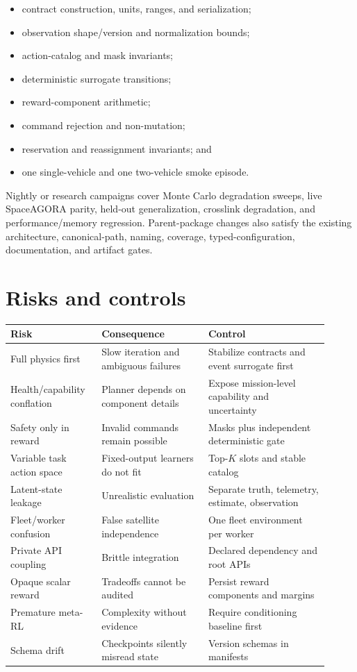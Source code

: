 \documentclass[11pt]{article}
\begin{document}
\begin{itemize}
  \item contract construction, units, ranges, and serialization;
  \item observation shape/version and normalization bounds;
  \item action-catalog and mask invariants;
  \item deterministic surrogate transitions;
  \item reward-component arithmetic;
  \item command rejection and non-mutation;
  \item reservation and reassignment invariants; and
  \item one single-vehicle and one two-vehicle smoke episode.
\end{itemize}

Nightly or research campaigns cover Monte Carlo degradation sweeps, live
SpaceAGORA parity, held-out generalization, crosslink degradation, and
performance/memory regression.  Parent-package changes also satisfy the
existing architecture, canonical-path, naming, coverage, typed-configuration,
documentation, and artifact gates.

\section{Risks and controls}

\begin{longtable}{P{0.25\linewidth}P{0.31\linewidth}P{0.35\linewidth}}
\toprule
Risk & Consequence & Control \\
\midrule
\endhead
Full physics first & Slow iteration and ambiguous failures & Stabilize contracts and event surrogate first \\
Health/capability conflation & Planner depends on component details & Expose mission-level capability and uncertainty \\
Safety only in reward & Invalid commands remain possible & Masks plus independent deterministic gate \\
Variable task action space & Fixed-output learners do not fit & Top-$K$ slots and stable catalog \\
Latent-state leakage & Unrealistic evaluation & Separate truth, telemetry, estimate, observation \\
Fleet/worker confusion & False satellite independence & One fleet environment per worker \\
Private API coupling & Brittle integration & Declared dependency and root APIs \\
Opaque scalar reward & Tradeoffs cannot be audited & Persist reward components and margins \\
Premature meta-RL & Complexity without evidence & Require conditioning baseline first \\
Schema drift & Checkpoints silently misread state & Version schemas in manifests \\
\bottomrule
\end{longtable}
\end{document}
